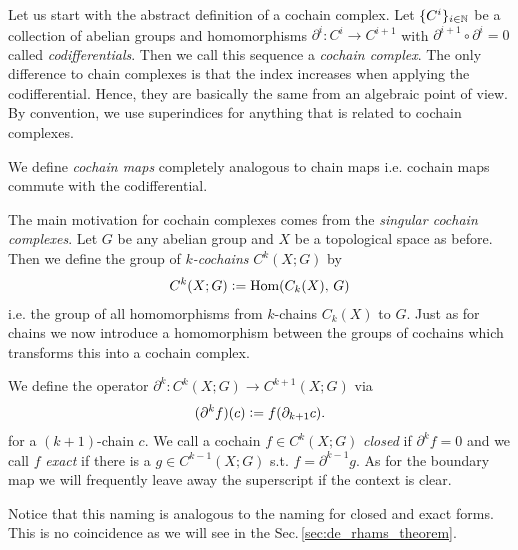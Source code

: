 \documentclass[../main.tex]{subfiles}
\begin{document}
Let us start with the abstract definition of a cochain complex.
Let $\{ C^i \}_{i\in \mathbb{N}}$ be a collection of abelian groups
and homomorphisms $\partial^i: C^i \rightarrow C^{i+1}$ with 
$\partial^{i+1} \circ \partial^i = 0$ called \textit{codifferentials}. 
Then we call this sequence a 
\textit{cochain complex}. The only difference to chain complexes
is that the index 
increases when applying the codifferential. Hence, they are 
basically the same from an algebraic point of view.
By convention, 
we use superindices for anything that is related to cochain complexes. 

We define \textit{cochain maps} completely analogous to chain maps 
i.e. cochain maps commute with the codifferential.

The main motivation for cochain complexes comes from the 
\textit{singular cochain complexes}.
Let $G$ be any abelian group and $X$ be a topological space as before. 
Then we define the group 
of \textit{$k$-cochains} $C^k(X;G)$ by
\begin{align*}
    C^k(X;G) \vcentcolon= \text{Hom}(C_k(X),\,G)
\end{align*}
i.e. the group of all homomorphisms from $k$-chains $C_k(X)$ to $G$. 
Just as for chains we now introduce a homomorphism between the groups of cochains
which transforms this into a cochain complex.
\begin{definition}[Coboundary ]
    We define the operator $\partial^k: C^k(X;G) \rightarrow C^{k+1}(X;G)$ via
    \begin{align*}
        (\partial^k f) (c) \vcentcolon= f(\partial_{k+1} c).
    \end{align*}
    for a $(k+1)$-chain $c$.
    We call a cochain $f \in C^k(X;G)$ \textit{closed} if $\partial^k f = 0$ 
    and we call $f$
    \textit{exact} if there is a $g \in C^{k-1}(X;G)$ s.t. $f = \partial^{k-1} g$.
    As for the boundary map we will frequently leave away the superscript if
    the context is clear.
\end{definition}
Notice that this naming is analogous to the naming for closed and exact forms. 
This is no coincidence as we will see in the Sec.\,\ref{sec:de_rhams_theorem}.
\end{document}
